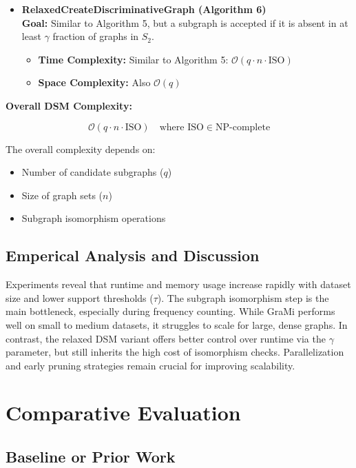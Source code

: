 \documentclass[11pt]{article}
\begin{document}
\begin{itemize}[noitemsep]
    \item \textbf{RelaxedCreateDiscriminativeGraph (Algorithm 6)} \\
    \textbf{Goal:} Similar to Algorithm 5, but a subgraph is accepted if it is absent in at least $\gamma$ fraction of graphs in $S_2$.
    \begin{itemize}[noitemsep]
        \item \textbf{Time Complexity:} Similar to Algorithm 5: $\mathcal{O}(q \cdot n \cdot \text{ISO})$
        \item \textbf{Space Complexity:} Also $\mathcal{O}(q)$
    \end{itemize}
\end{itemize}

\textbf{Overall DSM Complexity:}

\[
\mathcal{O}(q \cdot n \cdot \text{ISO}) \quad \text{where } \text{ISO} \in \text{NP-complete}
\]

\noindent The overall complexity depends on:
\begin{itemize}[noitemsep]
    \item Number of candidate subgraphs ($q$)
    \item Size of graph sets ($n$)
    \item Subgraph isomorphism operations
\end{itemize}
\subsection{Emperical Analysis and Discussion }

Experiments reveal that runtime and memory usage increase rapidly with dataset size and lower support thresholds ($\tau$). The subgraph isomorphism step is the main bottleneck, especially during frequency counting. While GraMi performs well on small to medium datasets, it struggles to scale for large, dense graphs. In contrast, the relaxed DSM variant offers better control over runtime via the $\gamma$ parameter, but still inherits the high cost of isomorphism checks. Parallelization and early pruning strategies remain crucial for improving scalability.


\section{Comparative Evaluation}
\subsection*{Baseline or Prior Work}
\end{document}
